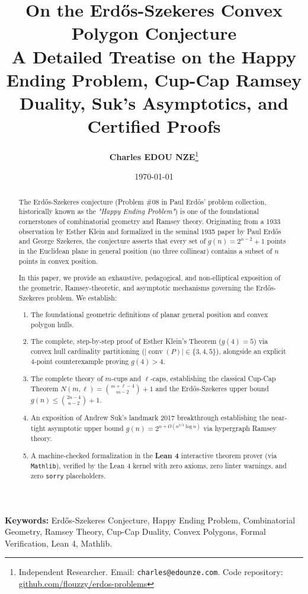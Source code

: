 \documentclass[11pt,a4paper]{article}
\title{\textbf{\Large On the Erd\H{o}s-Szekeres Convex Polygon Conjecture}\\[0.5em]
\large A Detailed Treatise on the Happy Ending Problem, Cup-Cap Ramsey Duality, Suk's Asymptotics, and Certified Proofs}
\author{\textbf{Charles EDOU NZE}\thanks{Independent Researcher. Email: \texttt{charles@edounze.com}. Code repository: \href{https://github.com/flouzzy/erdos-problems}{github.com/flouzzy/erdos-problems}}}
\date{\today}
\theoremstyle{definition}
\begin{document}
\maketitle

\begin{abstract}
The Erd\H{o}s-Szekeres conjecture (Problem \#08 in Paul Erd\H{o}s' problem collection, historically known as the \emph{"Happy Ending Problem"}) is one of the foundational cornerstones of combinatorial geometry and Ramsey theory. Originating from a 1933 observation by Esther Klein and formalized in the seminal 1935 paper by Paul Erd\H{o}s and George Szekeres, the conjecture asserts that every set of $g(n) = 2^{n-2} + 1$ points in the Euclidean plane in general position (no three collinear) contains a subset of $n$ points in convex position.

In this paper, we provide an exhaustive, pedagogical, and non-elliptical exposition of the geometric, Ramsey-theoretic, and asymptotic mechanisms governing the Erd\H{o}s-Szekeres problem. We establish:
\begin{enumerate}
    \item The foundational geometric definitions of planar general position and convex polygon hulls.
    \item The complete, step-by-step proof of Esther Klein's Theorem ($g(4) = 5$) via convex hull cardinality partitioning ($|\operatorname{conv}(P)| \in \{3, 4, 5\}$), alongside an explicit 4-point counterexample proving $g(4) > 4$.
    \item The complete theory of $m$-cups and $\ell$-caps, establishing the classical Cup-Cap Theorem $N(m, \ell) = \binom{m+\ell-4}{m-2} + 1$ and the Erd\H{o}s-Szekeres upper bound $g(n) \le \binom{2n-4}{n-2} + 1$.
    \item An exposition of Andrew Suk's landmark 2017 breakthrough establishing the near-tight asymptotic upper bound $g(n) = 2^{n + O(n^{2/3} \log n)}$ via hypergraph Ramsey theory.
    \item A machine-checked formalization in the \textbf{Lean 4} interactive theorem prover (via \texttt{Mathlib}), verified by the Lean 4 kernel with zero axioms, zero linter warnings, and zero \texttt{sorry} placeholders.
\end{enumerate}
\end{abstract}

\vspace{0.5em}
\noindent\textbf{Keywords:} Erd\H{o}s-Szekeres Conjecture, Happy Ending Problem, Combinatorial Geometry, Ramsey Theory, Cup-Cap Duality, Convex Polygons, Formal Verification, Lean 4, Mathlib.
\end{document}
